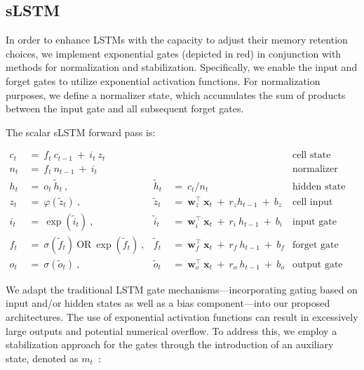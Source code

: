\subsection{sLSTM}
\label{sec:sLSTM}

In order to enhance LSTMs with the capacity to adjust their memory retention choices, we implement exponential gates (depicted in red) in conjunction with methods for normalization and stabilization. Specifically, we enable the input and forget gates to utilize exponential activation functions. For normalization purposes, we define a normalizer state, which accumulates the sum of products between the input gate and all subsequent forget gates.

The scalar sLSTM forward pass is:

\begin{align}
\label{eq:slstmforward}
c_t \ &= \  f_t \ c_{t-1} \ + \ i_t \ z_t & & 
 &\text{cell state} \\
n_t \ &= \  f_t \ n_{t-1} \ + \ i_t  & & 
 &\text{normalizer state} \\
h_t \ &= \ o_t \ \tilde{h}_t \ ,
  &\tilde{h}_t \ &= \ c_t / n_t
&\text{hidden state} \\
z_t \ &= \ \varphi \left( \tilde{z}_t \right) \ , 
  &\tilde{z}_t \ &=  \ \mathbf{w}^\top_{z} \ \mathbf{x}_t \ + \
  r_{z}  h_{t-1} \ + \  b_{z}
  &\text{cell input} \\
i_t \ &= \ \!\exp \left( \tilde{i}_t  \right) \ , 
  &\tilde{i}_t \ &= \ \mathbf{w}^\top_{i} \ \mathbf{x}_t \ + \
  r_{i}  \ h_{t-1} \ + \  b_{i}
  &\text{input gate} \\
f_t \ &= \ \sigma \left(  \tilde{f}_t \right) \ \text{OR} \
\!\exp \left(  \tilde{f}_t \right) \ ,
  &\tilde{f}_t \ &= \ \mathbf{w}^\top_{f} \ \mathbf{x}_t  \ + \
  r_{f}  \ h_{t-1} \ + \  b_{f}
  &\text{forget gate} \\
o_t \ &= \ \sigma \left( \tilde{o}_t \right) \ , 
  &\tilde{o}_t  \ &= \ \mathbf{w}^\top_{o} \ \mathbf{x}_t \ + \
  r_{o}  \ h_{t-1} \ + \  b_{o}
  &\text{output gate} 
\end{align}

We adapt the traditional LSTM gate mechanisms—incorporating gating based on input and/or hidden states as well as a bias component—into our proposed architectures. The use of exponential activation functions can result in excessively large outputs and potential numerical overflow. To address this, we employ a stabilization approach for the gates through the introduction of an auxiliary state, denoted as \mbox{$m_t$~\citep{Milakov:18arxiv}}:

